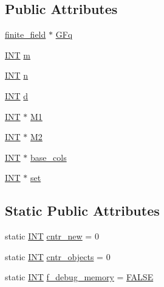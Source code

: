 \subsection*{Public Attributes}
\begin{DoxyCompactItemize}
\item 
\mbox{\hyperlink{classfinite__field}{finite\+\_\+field}} $\ast$ \mbox{\hyperlink{classrank__checker_a0478b884d4dd788e0240ffebe96b58b0}{G\+Fq}}
\item 
\mbox{\hyperlink{galois_8h_a09fddde158a3a20bd2dcadb609de11dc}{I\+NT}} \mbox{\hyperlink{classrank__checker_a3c584524970de26ecd182d426299661d}{m}}
\item 
\mbox{\hyperlink{galois_8h_a09fddde158a3a20bd2dcadb609de11dc}{I\+NT}} \mbox{\hyperlink{classrank__checker_a86416945933e955d430e95c30446cb60}{n}}
\item 
\mbox{\hyperlink{galois_8h_a09fddde158a3a20bd2dcadb609de11dc}{I\+NT}} \mbox{\hyperlink{classrank__checker_a7e17ed13389454e5738b06169b366386}{d}}
\item 
\mbox{\hyperlink{galois_8h_a09fddde158a3a20bd2dcadb609de11dc}{I\+NT}} $\ast$ \mbox{\hyperlink{classrank__checker_a09ae7106229c5d5619f33beb1cb696e2}{M1}}
\item 
\mbox{\hyperlink{galois_8h_a09fddde158a3a20bd2dcadb609de11dc}{I\+NT}} $\ast$ \mbox{\hyperlink{classrank__checker_aec2b5fe29fe63d2abb928b13611a132d}{M2}}
\item 
\mbox{\hyperlink{galois_8h_a09fddde158a3a20bd2dcadb609de11dc}{I\+NT}} $\ast$ \mbox{\hyperlink{classrank__checker_aa53343a0d2862dfbbc41de8952d7bc81}{base\+\_\+cols}}
\item 
\mbox{\hyperlink{galois_8h_a09fddde158a3a20bd2dcadb609de11dc}{I\+NT}} $\ast$ \mbox{\hyperlink{classrank__checker_adb8e9d43e5242320d64755c191d7412b}{set}}
\end{DoxyCompactItemize}
\subsection*{Static Public Attributes}
\begin{DoxyCompactItemize}
\item 
static \mbox{\hyperlink{galois_8h_a09fddde158a3a20bd2dcadb609de11dc}{I\+NT}} \mbox{\hyperlink{classrank__checker_a49a0cacfafa74b3912078f894e72e84e}{cntr\+\_\+new}} = 0
\item 
static \mbox{\hyperlink{galois_8h_a09fddde158a3a20bd2dcadb609de11dc}{I\+NT}} \mbox{\hyperlink{classrank__checker_a5c646fb838907d980a8b4a089ab96f32}{cntr\+\_\+objects}} = 0
\item 
static \mbox{\hyperlink{galois_8h_a09fddde158a3a20bd2dcadb609de11dc}{I\+NT}} \mbox{\hyperlink{classrank__checker_abdcf049fd170d2a99bbef7de4af741da}{f\+\_\+debug\+\_\+memory}} = \mbox{\hyperlink{nauty_8h_aa93f0eb578d23995850d61f7d61c55c1}{F\+A\+L\+SE}}
\end{DoxyCompactItemize}


